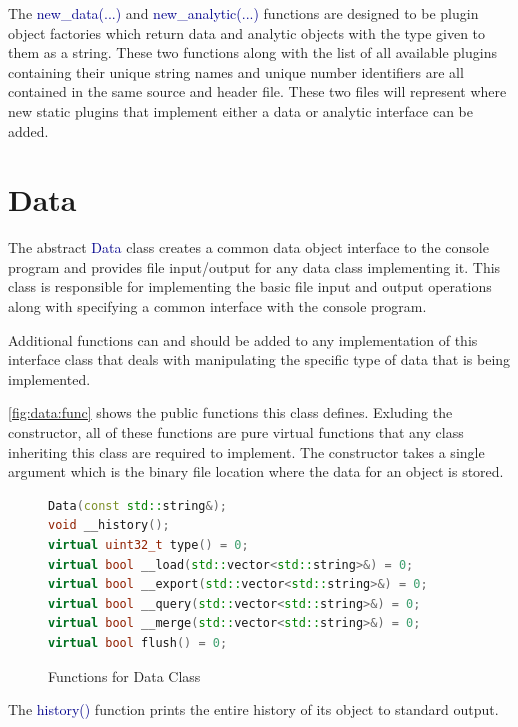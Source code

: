 \documentclass[10pt]{article}
\providecommand{\h}[1]{\textcolor{darkblue}{#1}}
\begin{document}
The \h{new\_data(...)} and \h{new\_analytic(...)} functions are designed to be 
plugin object factories which return data and analytic objects with the type 
given to them as a string. These two functions along with the list of all 
available plugins containing their unique string names and unique number 
identifiers are all contained in the same source and header file. These two 
files will represent where new static plugins that implement either a data or 
analytic interface can be added.

\newpage
\section{Data}

The abstract \h{Data} class creates a common data object interface to the 
console program and provides file input/output for any data class implementing 
it. This class is responsible for implementing the basic file input and output 
operations along with specifying a common interface with the console program.

Additional functions can and should be added to any implementation of this 
interface class that deals with manipulating the specific type of data that is 
being implemented.

\autoref{fig:data:func} shows the public functions this class defines. 
Exluding the constructor, all of these functions are pure virtual functions 
that any class inheriting this class are required to implement. The constructor 
takes a single argument which is the binary file location where the data for an 
object is stored.

\begin{figure}[H]
\begin{mdframed}[style=functions]
\begin{lstlisting}[language=C++]
Data(const std::string&);
void __history();
virtual uint32_t type() = 0;
virtual bool __load(std::vector<std::string>&) = 0;
virtual bool __export(std::vector<std::string>&) = 0;
virtual bool __query(std::vector<std::string>&) = 0;
virtual bool __merge(std::vector<std::string>&) = 0;
virtual bool flush() = 0;
\end{lstlisting}
\end{mdframed}
\caption{Functions for Data Class}
\label{fig:data:func}
\end{figure}

The \h{history()} function prints the entire history of its object to standard 
output.
\end{document}

